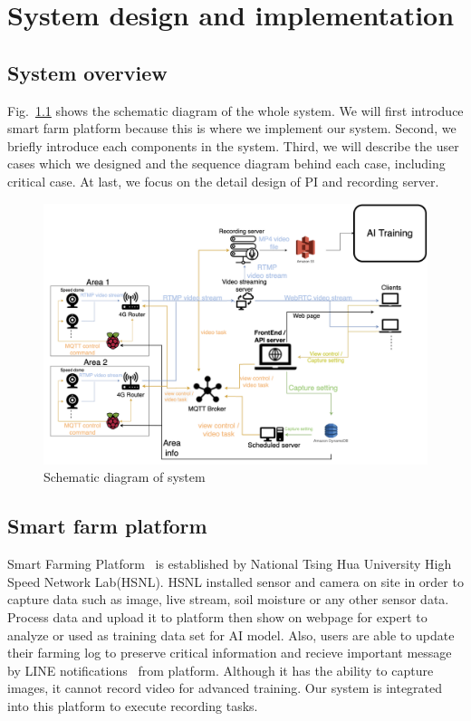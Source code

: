 \chapter{System design and implementation}
\label{c:system-design-and-implementation}


\graphicspath{{./figsrc/}}
\fi

\section{System overview}
Fig.~\ref{fig:big-system} shows the schematic diagram of the whole system. We will first introduce smart farm platform because this is where we implement our system. Second, we briefly introduce each components in the system. Third, we will describe the user cases which we designed and the sequence diagram behind each case, including critical case. At last, we focus on the detail design of PI and recording server.

\begin{figure}[H]
    \centering
    \includegraphics[width=\textwidth]{figsrc/big-system.png}
    \caption{Schematic diagram of system\label{fig:big-system}}
\end{figure}

\section{Smart farm platform}
Smart Farming Platform~\cite{agri-web} is established by National Tsing Hua University High Speed Network Lab(HSNL). HSNL installed sensor and camera on site in order to capture data such as image, live stream, soil moisture or any other sensor data. Process data and upload it to platform then show on webpage for expert to analyze or used as training data set for AI model. Also, users are able to update their farming log to preserve critical information and recieve important message by LINE notifications~\cite{line-notify} from platform. Although it has the ability to capture images, it cannot record video for advanced training. Our system is integrated into this platform to execute recording tasks.

